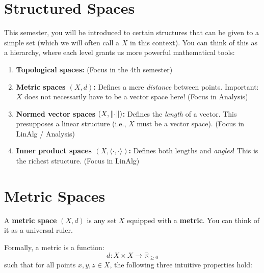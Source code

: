\setcounter{section}{0} 

\section{Structured Spaces}

This semester, you will be introduced to certain structures that can be given to a simple set (which we will often call a  $X$ in this context). You can think of this as a hierarchy, where each level grants us more powerful mathematical tools:

\begin{enumerate}
    \item \textbf{Topological spaces:} \textcolor{eGray}{(Focus in the 4th semester)}
    \item \textbf{Metric spaces $(X, d)$:} Defines a mere \emph{distance} between points. Important: $X$ does not necessarily have to be a vector space here! \textcolor{eGray}{(Focus in Analysis)}
    \item \textbf{Normed vector spaces $(X, \lVert\cdot\rVert)$:} Defines the \emph{length} of a vector. This presupposes a linear structure (i.e., $X$ must be a vector space). \textcolor{eGray}{(Focus in LinAlg / Analysis)}
    \item \textbf{Inner product spaces $(X, \langle \cdot, \cdot \rangle)$:} Defines both lengths and \emph{angles}! This is the richest structure. \textcolor{eGray}{(Focus in LinAlg)}
\end{enumerate}


\hrulefill

\section{Metric Spaces}

A \textbf{metric space} $(X, d)$ is any set $X$ equipped with a \textbf{metric}. You can think of it as a universal ruler.

Formally, a metric is a function:
\[ d: X \times X \to \mathbb{R}_{\ge 0} \]
such that for all points $x, y, z \in X$, the following three intuitive properties hold:

